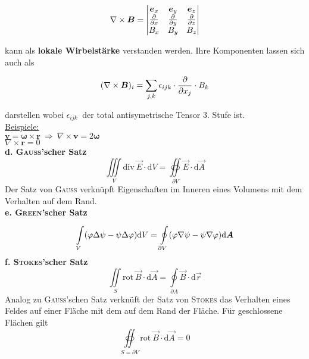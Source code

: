 \begin{equation*}
\nabla\times\bm{B}=\begin{vmatrix}
\bm{e}_x & \bm{e}_y & \bm{e}_z \\
\frac{\partial{}}{\partial{x}} & \frac{\partial{}}{\partial{y}} & \frac{\partial{}}{\partial{z}}\\
B_x & B_y & B_z
\end{vmatrix}
\end{equation*}

kann als \textbf{lokale Wirbelstärke} verstanden werden. Ihre Komponenten lassen sich auch als

\begin{equation*}
(\nabla\times\bm{B})_i=\sum\limits_{j,k}\epsilon_{ijk}\cdot\frac{\partial{}}{\partial{x_j}}\cdot B_k
\end{equation*}

darstellen wobei $\epsilon_{ijk}\ $ der total antisymetrische Tensor 3. Stufe ist.\\
\linebreak
\underline{Beispiele:}\\
\linebreak
$\bm{v}=\bm{\omega}\times\bm{r} \ \Rightarrow \ \nabla\times\bm{v}=2\bm{\omega}$\\
$\nabla\times\bm{r}=0$\\
\linebreak\linebreak
\textbf{d. \textsc{Gauss}'scher Satz}\\
\begin{equation*}
\iiint\limits_V\mathrm{div\ }\vec{E}\cdot\mathrm{d}V=\oiint\limits_{\partial V}\vec{E}\cdot\mathrm{d}\vec{A}
\end{equation*}
Der Satz von \textsc{Gauss} verknüpft Eigenschaften im Inneren eines Volumens mit dem Verhalten auf dem Rand.\\
\linebreak
\textbf{e. \textsc{Green}'scher Satz}\\
\begin{equation*}
\int\limits_{V}^{} (\varphi\Delta\psi-\psi\Delta\varphi) \mathrm{d} V=\oint\limits_{\partial V}^{} (\varphi\nabla\psi-\psi\nabla\varphi) \mathrm{d} \bm{A}
\end{equation*}
\linebreak
\textbf{f. \textsc{Stokes}'scher Satz}\\
\begin{equation*}
\iint\limits_S\mathrm{rot\ }\vec{B}\cdot\mathrm{d}\vec{A}=\oint\limits_{\partial A}\vec{B}\cdot\mathrm{d}\vec{r}
\end{equation*}
Analog zu \textsc{Gauss}'schen Satz verknüft der Satz von \textsc{Stokes} das Verhalten eines Feldes auf einer Fläche mit dem auf dem Rand der Fläche. Für geschlossene Flächen gilt
\begin{equation*}
\oiint\limits_{S=\partial V}\mathrm{rot\ }\vec{B}\cdot\mathrm{d}\vec{A}=0
\end{equation*}
